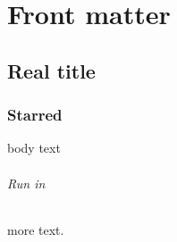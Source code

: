 \part{Front matter}

\chapter[Toc entry]{Real title} %

\section*{Starred} body text
\paragraph{Run in} more text.
